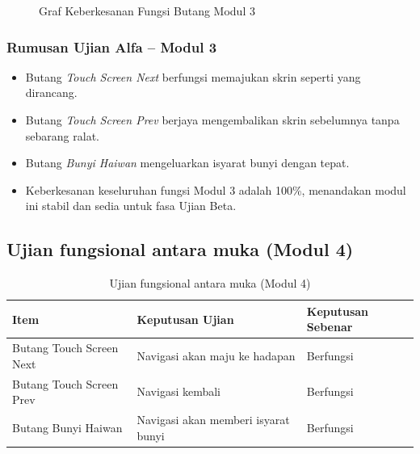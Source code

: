 {{\begin{figure}[h]
\centering
{}
\caption{Graf Keberkesanan Fungsi Butang Modul 3}
\label{rajah-5-4}
\end{figure}

\subsubsection{Rumusan Ujian Alfa – Modul 3}

\begin{itemize}[h]
  \item Butang \textit{Touch Screen Next} berfungsi memajukan skrin seperti yang dirancang.
  \item Butang \textit{Touch Screen Prev} berjaya mengembalikan skrin sebelumnya tanpa sebarang ralat.
  \item Butang \textit{Bunyi Haiwan} mengeluarkan isyarat bunyi dengan tepat.
  \item Keberkesanan keseluruhan fungsi Modul 3 adalah 100\%, menandakan modul ini stabil dan sedia untuk fasa Ujian Beta.
\end{itemize}
\clearpage

\subsection{Ujian fungsional antara muka (Modul 4)}
\begin{table}[h]
\centering
\caption{Ujian fungsional antara muka (Modul 4)}
\label{jadual-5-5}
\begin{tabular}{|l|l|l|}
\hline
\textbf{Item} & \textbf{Keputusan Ujian} & \textbf{Keputusan Sebenar} \\ \hline
Butang Touch Screen Next & Navigasi akan maju ke hadapan & Berfungsi \\ \hline
Butang Touch Screen Prev & Navigasi kembali & Berfungsi \\ \hline
Butang Bunyi Haiwan & Navigasi akan memberi isyarat bunyi & Berfungsi \\ \hline
\end{tabular}
\end{table}

}}
